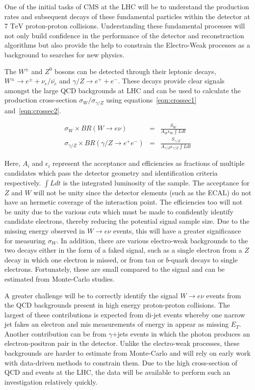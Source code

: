 \documentclass[a4paper,10pt]{article}
\begin{document}
One of the initial tasks of CMS at the LHC will be to understand the production rates and subsequent decays of these fundamental particles within the detector at 7 $\mathrm{TeV}$ proton-proton collisions.
Understanding these fundamental processes will not only build confidence in the performance of the detector and reconstruction algorithms but also provide the help to constrain the Electro-Weak
processes as a background to searches for new physics.

The $W^{\pm}$ and $Z^{0}$ bosons can be detected through their leptonic decays, $W^{\pm} \rightarrow e^{\pm} + \nu_{e} / \bar{\nu_e}$ and $\gamma / Z \rightarrow e^+ +e^- $. 
These decays provide clear signals amongst the large QCD backgrounds at LHC and can be used to calculate the production cross-section $\sigma_W / \sigma_{\gamma/Z} $ 
using equations~\ref{eqn:crossec1} and~\ref{eqn:crossec2}.

\begin{eqnarray}
  \sigma_W \times BR(W\rightarrow e\nu) & = & \frac{\displaystyle S_W }{\displaystyle A_W \epsilon_W \int L dt} \label{eqn:crossec1}\\
  \sigma_{\gamma/Z} \times BR({\gamma/Z}\rightarrow e^+ e^- ) & = & \frac{\displaystyle S_{\gamma/Z} }{\displaystyle A_{\gamma/Z} \epsilon_{\gamma/Z} \int L dt} \label{eqn:crossec2}
\end{eqnarray}

Here, $A_i$ and $\epsilon_i$ represent the acceptance and efficiencies as fractions of multiple candidates which pass the detector geometry and identification criteria respectively.
$\int L dt$ is the integrated luminosity of the sample. The acceptance for $Z$ and $W$ will not be unity since the detector elements (such as the ECAL) do
not have an hermetic coverage of the interaction point. The efficiencies too will not be unity due to the various cuts which must be made to confidently identify candidate electrons,
thereby reducing the potential signal sample size. Due to the missing energy observed in $W\rightarrow e\nu$ events, this will have a greater significance for measuring $\sigma_W$. 
In addition, there are various electro-weak
backgrounds to the two decays either in the form of a faked signal, such as a single electron from a $Z$ decay in which one electron is missed, or from tau or $b$-quark decays to single electrons. 
Fortunately, these are small compared to the signal and can be estimated from Monte-Carlo studies.   

A greater challenge will be to correctly identify the signal $W\rightarrow e\nu$ events from the QCD backgrounds present in high energy proton-proton collisions. The largest of these contributions is expected
from di-jet events whereby one narrow jet fakes an electron and mis measurements of energy in appear as missing $E_T$. Another contribution can be from $\gamma$+jets events in which the photon produces
an electron-positron pair in the detector. Unlike the electro-weak processes, these backgrounds are harder to estimate from Monte-Carlo and will rely on early work with data-driven methods to constrain them.
Due to the high cross-section of QCD and events at the LHC, the data will be available to perform such an investigation relatively quickly.
\end{document}
